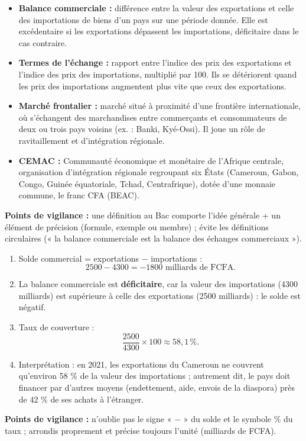 \documentclass[11pt]{article}
\begin{document}
\begin{corrige}
\begin{itemize}
\item \textbf{Balance commerciale :} différence entre la valeur des exportations et celle des importations de biens d'un pays sur une période donnée. Elle est excédentaire si les exportations dépassent les importations, déficitaire dans le cas contraire.
\item \textbf{Termes de l'échange :} rapport entre l'indice des prix des exportations et l'indice des prix des importations, multiplié par 100. Ils se détériorent quand les prix des importations augmentent plus vite que ceux des exportations.
\item \textbf{Marché frontalier :} marché situé à proximité d'une frontière internationale, où s'échangent des marchandises entre commerçants et consommateurs de deux ou trois pays voisins (ex. : Banki, Kyé-Ossi). Il joue un rôle de ravitaillement et d'intégration régionale.
\item \textbf{CEMAC :} Communauté économique et monétaire de l'Afrique centrale, organisation d'intégration régionale regroupant six États (Cameroun, Gabon, Congo, Guinée équatoriale, Tchad, Centrafrique), dotée d'une monnaie commune, le franc CFA (BEAC).
\end{itemize}
\textbf{Points de vigilance :} une définition au Bac comporte l'idée générale + un élément de précision (formule, exemple ou membre) ; évite les définitions circulaires (« la balance commerciale est la balance des échanges commerciaux »).
\end{corrige}

\begin{corrige}
\begin{enumerate}
\item Solde commercial = exportations $-$ importations :
\[ \num{2500} - \num{4300} = \num{-1800} \text{ milliards de FCFA.} \]
\item La balance commerciale est \textbf{déficitaire}, car la valeur des importations (\num{4300} milliards) est supérieure à celle des exportations (\num{2500} milliards) : le solde est négatif.
\item Taux de couverture :
\[ \frac{\num{2500}}{\num{4300}} \times 100 \approx 58,1\,\%. \]
\item Interprétation : en 2021, les exportations du Cameroun ne couvrent qu'environ 58 \% de la valeur des importations ; autrement dit, le pays doit financer par d'autres moyens (endettement, aide, envois de la diaspora) près de 42 \% de ses achats à l'étranger.
\end{enumerate}
\textbf{Points de vigilance :} n'oublie pas le signe « $-$ » du solde et le symbole \% du taux ; arrondis proprement et précise toujours l'unité (milliards de FCFA).
\end{corrige}
\end{document}
